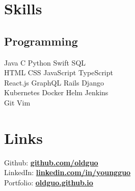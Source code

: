 \documentclass[]{deedy-resume}
\begin{document}
\begin{minipage}[t]{0.33\textwidth}
\sectionsep{}


\section{Skills}
\subsection{Programming}
Java \textbullet{} C \textbullet{} Python \textbullet{} Swift \textbullet{} SQL\\
HTML \textbullet{} CSS \textbullet{} JavaScript \textbullet{} TypeScript \\
React.js \textbullet{} GraphQL \textbullet{} Rails \textbullet{} Django \\
Kubernetes \textbullet{} Docker \textbullet{} Helm \textbullet{} Jenkins\\
Git \textbullet{} Vim
\sectionsep{}


\section{Links}
Github: \href{https://github.com/oldguo}{\textbf{github.com/oldguo}} \\
LinkedIn: \href{https://linkedin.com/in/youngguo}{\textbf{linkedin.com/in/youngguo}} \\
Portfolio: \href{https://oldguo.github.io/}{\textbf{oldguo.github.io}}
\sectionsep{}


%
%

\end{minipage}
\hfill
\end{document}
